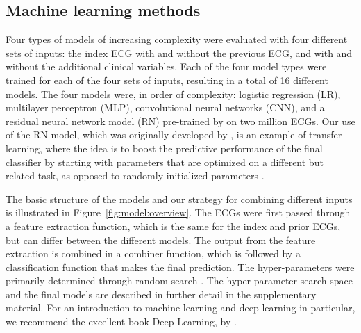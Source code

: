 \documentclass[preprint]{elsarticle}
\begin{document}
\subsection{Machine learning methods}
Four types of models of increasing complexity were evaluated with four different sets of inputs: the index ECG with and without the previous ECG, and with and without the additional clinical variables. Each of the four model types were trained for each of the four sets of inputs, resulting in a total of 16 different models. The four models were, in order of complexity: logistic regression (LR), multilayer perceptron (MLP), convolutional neural networks (CNN), and a residual neural network model (RN) pre-trained by \citet{ribeiro2020} on two million ECGs. Our use of the RN model, which was originally developed by \citet{he2016}, is an example of transfer learning, where the idea is to boost the predictive performance of the final classifier by starting with parameters that are optimized on a different but related task, as opposed to randomly initialized parameters \citep{weiss2016}. 

The basic structure of the models and our strategy for combining different inputs is illustrated in Figure~\ref{fig:model:overview}. The ECGs were first passed through a feature extraction function, which is the same for the index and prior ECGs, but can differ between the different models. The output from the feature extraction is combined in a combiner function, which is followed by a classification function that makes the final prediction. The hyper-parameters were primarily determined through random search \citep{bergstra2012}. The hyper-parameter search space and the final models are described in further detail in the supplementary material. For an introduction to machine learning and deep learning in particular, we recommend the excellent book Deep Learning, by \citet{goodfellow2016}.
\end{document}
